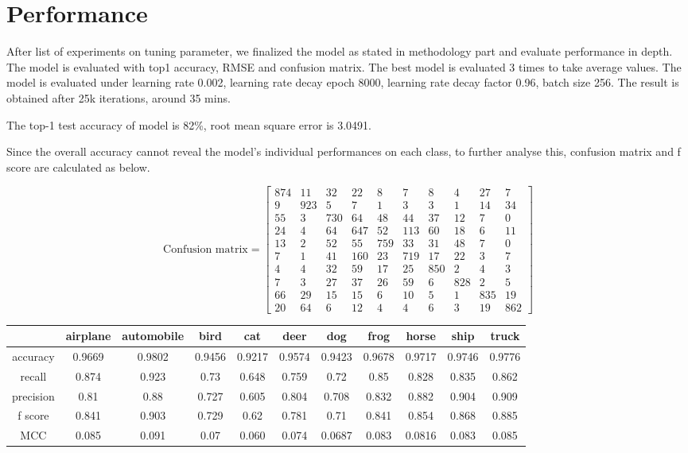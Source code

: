 \documentclass[journal,onecolumn, 12pt]{IEEEtran}
\begin{document}
\section{Performance}
After list of experiments on tuning parameter, we finalized the model as stated in methodology part and evaluate performance in depth. The model is evaluated with top1 accuracy, RMSE and confusion matrix. The best model is evaluated 3 times to take average values. The model is evaluated under learning rate 0.002, learning rate decay epoch 8000, learning rate decay factor 0.96, batch size 256. The result is obtained after 25k iterations, around 35 mins.

The top-1 test accuracy of model is 82\%, root mean square error is 3.0491. 

Since the overall accuracy cannot reveal the model’s individual performances on each class, to further analyse this, confusion matrix and f score are calculated as below.

\[
\textrm{Confusion matrix} =
\begin{bmatrix}
 874 &  11 &  32 &  22 &   8 &   7 &   8 &   4 &  27 &   7\\
   9 & 923 &   5 &   7 &   1 &   3 &   3 &   1 &  14 &  34\\
  55 &   3 & 730 &  64 &  48 &  44 &  37 &  12 &   7 &   0\\
  24 &   4 &  64 & 647 &  52 & 113 &  60 &  18 &   6 &  11\\
  13 &   2 &  52 &  55 & 759 &  33 &  31 &  48 &   7 &   0\\
   7 &   1 &  41 & 160 &  23 & 719 &  17 &  22 &   3 &   7\\
   4 &   4 &  32 &  59 &  17 &  25 & 850 &   2 &   4 &   3\\
   7 &   3 &  27 &  37 &  26 &  59 &   6 & 828 &   2 &   5\\
  66 &  29 &  15 &  15 &   6 &  10 &   5 &   1 & 835 &  19\\
  20 &  64 &   6 &  12 &   4 &   4 &   6 &   3 &  19 & 862
\end{bmatrix}
\]

\begin{tabular}{*{11}{c}}
  \hline
  {} & airplane & automobile & bird & cat & deer & dog & frog & horse & ship & truck\\
  \hline
  accuracy & 0.9669 & 0.9802 & 0.9456 & 0.9217 & 0.9574 & 0.9423 & 0.9678 & 0.9717 & 0.9746 & 0.9776\\
  recall & 0.874 & 0.923 & 0.73 & 0.648 & 0.759 & 0.72 & 0.85 & 0.828 & 0.835 & 0.862\\
  precision & 0.81 & 0.88 & 0.727 & 0.605 & 0.804 & 0.708 & 0.832 & 0.882 & 0.904 & 0.909\\
  f score & 0.841 & 0.903 & 0.729 & 0.62 & 0.781 &  0.71 & 0.841 & 0.854 & 0.868 & 0.885\\
  MCC & 0.085 & 0.091 & 0.07 & 0.060 & 0.074 & 0.0687 & 0.083 & 0.0816 & 0.083 & 0.085\\
  \hline
\end{tabular}\\
\end{document}
